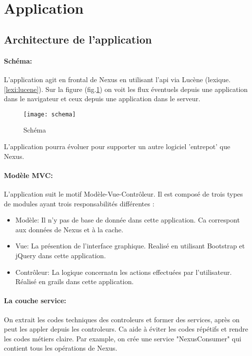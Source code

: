 \section{Application}

\subsection{Architecture de l'application}

\paragraph{Schéma:}
L'application agit en frontal de Nexus en utilisant l'api via Lucène (lexique.\ref{lexi:lucene}).
Sur la figure (fig.\ref{fig:schema}) on voit les flux éventuels depuis une application dans le navigateur et ceux depuis une application dans le serveur.

\begin{figure}[ht]
 \centering
 \texttt{[image: schema]}
 \caption{Schéma}
 \label{fig:schema}
\end{figure}

L'application pourra évoluer pour supporter un autre logiciel 'entrepot' que Nexus.

\paragraph{Modèle MVC:}
L'application suit le motif Modèle-Vue-Contrôleur.
Il est composé de  trois types de modules ayant trois responsabilités différentes :
\begin{itemize}
 \item Modèle: Il n'y pas de base de donnée dans cette application. Ca correspont aux données de Nexus et à la cache.
 \item Vue: La présention de l'interface graphique. Realisé en utilisant Bootstrap et jQuery dans cette application.
 \item Contrôleur: La logique concernatn les actions effectuées par l'utilisateur. Réalisé en grails dans cette application.
\end{itemize}

\paragraph{La couche service:}
On extrait les codes techniques des controleurs et former des services, après on peut les appler depuis les controleurs.
Ca aide à éviter les codes répétifs et rendre les codes métiers claire.
Par example, on crée une service "NexusConsumer" qui contient tous les opérations de Nexus.

